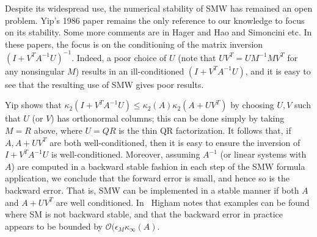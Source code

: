 \documentclass{siamltex}
\newcommand{\eps}{\epsilon}
\begin{document}
Despite its widespread use, the numerical stability of SMW has remained an open problem. Yip's 1986 paper \cite{Yip86} remains the only reference to our knowledge to focus on its stability. Some more comments are in Hager \cite{Hager89} and Hao and Simoncini \cite{Hao21} etc. In these papers, the focus is on the conditioning of the matrix inversion $(I + V^T\!A^{-1}U)^{-1}$. Indeed, a poor choice of $U$ 
(note that $UV^T=UM^{-1}MV^T$ for any nonsingular $M$) results in an ill-conditioned $(I + V^T\!A^{-1}U)$, and it is easy to see that the resulting use of SMW gives poor results. 

Yip shows that $\kappa_2(I + V^T\!A^{-1}U)\leq \kappa_2(A)\kappa_2(A+UV^T)$
by choosing $U,V$ such that $U$ (or $V$) has orthonormal columns; this can be done simply by taking $M=R$ above, where $U=QR$ is the thin QR factorization. 
It follows that, if $A,A+UV^T$ are both well-conditioned, then it is easy to ensure the inversion of $I + V^T\!A^{-1}U$ is well-conditioned. Moreover, assuming $A^{-1}$ (or linear systems with $A$) are computed in a backward stable fashion in each step of the SMW formula application, we conclude that the forward error is small, and hence so is the backward error. That is, SMW can be implemented in a stable manner if both $A$ and $A+UV^T$ are well conditioned. 
In~\cite[Problem~26.2]{Higham02} Higham notes that examples can be found where SM is not backward stable, and that the backward error in practice appears to be bounded by $\mathcal{O}(\eps_M\kappa_\infty(A)$. 
\end{document}
